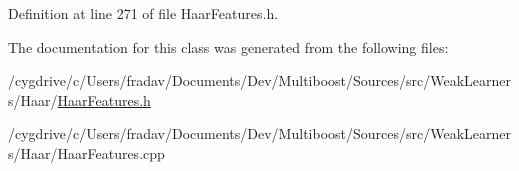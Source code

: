 Definition at line 271 of file HaarFeatures.h.



The documentation for this class was generated from the following files:\begin{DoxyCompactItemize}
\item 
/cygdrive/c/Users/fradav/Documents/Dev/Multiboost/Sources/src/WeakLearners/Haar/\hyperlink{HaarFeatures_8h}{HaarFeatures.h}\item 
/cygdrive/c/Users/fradav/Documents/Dev/Multiboost/Sources/src/WeakLearners/Haar/HaarFeatures.cpp\end{DoxyCompactItemize}
